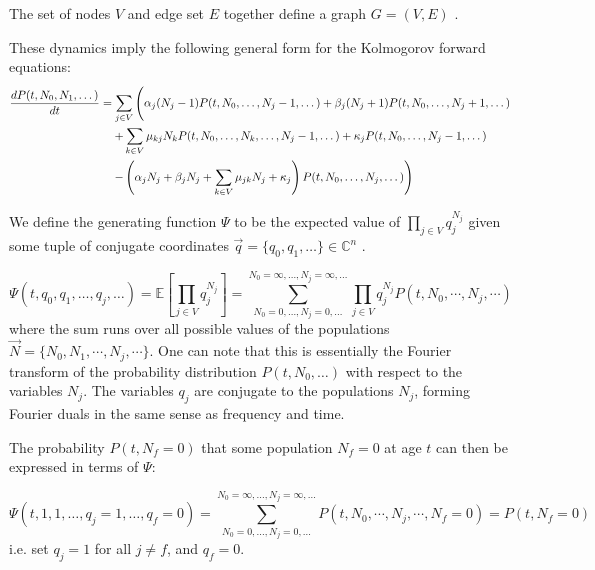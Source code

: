 \documentclass{article}
\begin{document}
The set of nodes $V$ and edge set $E$ together define a graph $G=(V,E)$
\cite{intrographs}.

These dynamics imply the following general form for the Kolmogorov forward
equations:
\begin{align}
    \frac{d P(t, N_0, N_1, \dots)}{dt} &=
    \sum_{j \in V} \left(
    \alpha_j (N_j - 1) P(t, N_0, \dots, N_j - 1, \dots)
    + \beta_j (N_j + 1) P(t, N_0, \dots, N_j + 1, \dots)
    \vphantom{\sum_a^b}
    \right.
    \nonumber \\
    &\quad \left. + \sum_{k \in V} \mu_{kj} N_k P(t, N_0, \dots, N_k, \dots,  N_j - 1, \dots)
    + \kappa_j P(t, N_0, \dots, N_j - 1, \dots)
    \right.
    \nonumber \\
    &\quad \left. 
    - \left(\alpha_j N_j + \beta_j N_j + \sum_{k \in V} \mu_{jk} N_j + \kappa_j\right)
    P(t, N_0, \dots, N_j, \dots)
    \vphantom{\sum_a^b}
    \right)
    \label{eq:kolmogorov}
\end{align}


We define the generating function $\Psi$ to be the expected value of $\prod_{j \in V}
q_j^{N_j}$ given some tuple of conjugate coordinates $\vec{q} = \{q_0, q_1, \dots\} \in
\mathbb{C}^n$ \cite{gfology}.

\begin{equation}
    \Psi(t,q_0,q_1,\dots,q_j,\dots) 
    = \mathbb{E}\left[\prod_{j \in V} q_j^{N_j}\right]
    = \sum_{N_0 = 0,\dots,N_j=0,\dots}^{N_0 = \infty,\dots, N_j = \infty, \dots} \prod_{j \in V} q_j^{N_j} 
        P(t, N_0, \cdots, N_j, \cdots)
\end{equation}
where the sum runs over all possible values of the populations $\vec{N} = \{N_0,
N_1, \cdots, N_j, \cdots\}$.
One can note that this is essentially the Fourier transform of the probability
distribution $P(t,N_0,\dots)$ with respect to the variables $N_j$. The variables
$q_j$ are conjugate to the populations $N_j$, forming Fourier duals in the same
sense as frequency and time.

The probability $P(t,N_f = 0)$ that some population $N_f = 0$ at age $t$ can
then be expressed in terms of $\Psi$:

\begin{equation}
    \Psi(t,1,1,\dots,q_j = 1,\dots, q_f = 0)
    = \sum_{N_0 = 0,\dots,N_j=0,\dots}^{N_0 = \infty,\dots, N_j = \infty, \dots}
        P(t, N_0, \cdots, N_j, \cdots, N_f = 0)
    = P(t,N_f = 0)
    \label{eq:corner}
\end{equation}
i.e. set $q_j = 1$ for all $j \neq f$, and $q_f = 0$.
\end{document}
